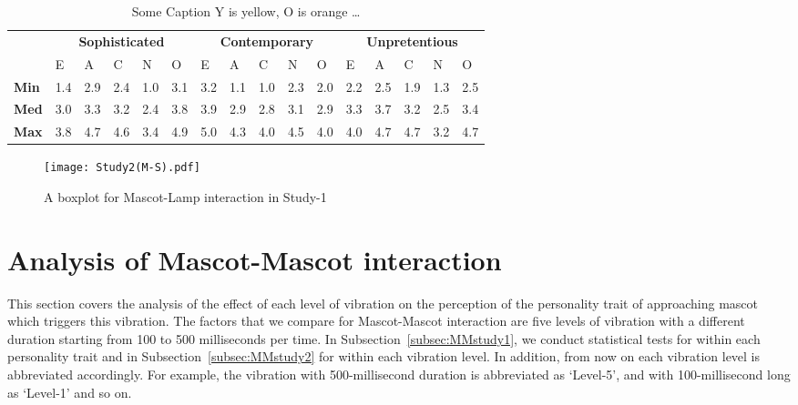 \begin{table}[H]
    \renewcommand{\arraystretch}{1.2}
    \caption{Some Caption Y is yellow, O is orange \ldots}
    \label{table:medianMS2}
    \begin{center}
        \begin{tabular}{p{}|
        p{}|p{}|p{}|p{}|p{}||
        p{}|p{}|p{}|p{}|p{}||
        p{}|p{}|p{}|p{}|p{}|}
            \cline{2-16}
            & \multicolumn{5}{c||}{\textbf{Sophisticated}} & \multicolumn{5}{c||}{\textbf{Contemporary}}
            & \multicolumn{5}{c|}{\textbf{Unpretentious}} \\
            \cline{2-16}
            & E & A & C & N & O 			    & E & A & C & N & O   	 	& E & A & C & N & O     \\
            \cline{2-16}
            \textbf{Min}  	& 1.4 & 2.9 & 2.4 & 1.0 & 3.1 		& 3.2 & 1.1 & 1.0 & 2.3 & 2.0  	& 2.2 & 2.5 & 1.9 & 1.3 & 2.5  \\
            \textbf{Med} 	& 3.0 & 3.3 & 3.2 & 2.4 & 3.8 		& 3.9 & 2.9 & 2.8 & 3.1 & 2.9  	& 3.3 & 3.7 & 3.2 & 2.5 & 3.4   \\
            \textbf{Max}	& 3.8 & 4.7 & 4.6 & 3.4 & 4.9 		& 5.0 & 4.3 & 4.0 & 4.5 & 4.0  	& 4.0 & 4.7 & 4.7 & 3.2 & 4.7 \\
            \cline{2-16}
        \end{tabular}
    \end{center}
\end{table}

\begin{figure}[H]
    \centering
    \texttt{[image: Study2(M-S).pdf]}
    \caption{A boxplot for Mascot-Lamp interaction in Study-1}
    \label{fig:MS2}
\end{figure}

\section{Analysis of Mascot-Mascot interaction}
\label{sec:m-m}
This section covers the analysis of the effect of each level of vibration on the perception
of the personality trait of approaching mascot which triggers this vibration.
The factors that we compare for Mascot-Mascot interaction are five levels of vibration
with a different duration starting from 100 to 500 milliseconds per time.
In Subsection~\ref{subsec:MMstudy1}, we conduct statistical tests for within each
personality trait and in Subsection~\ref{subsec:MMstudy2} for within each vibration level.
In addition, from now on each vibration level is abbreviated accordingly.
For example, the vibration with 500-millisecond duration is abbreviated
as ‘Level-5’, and with 100-millisecond long as ‘Level-1’ and so on.

